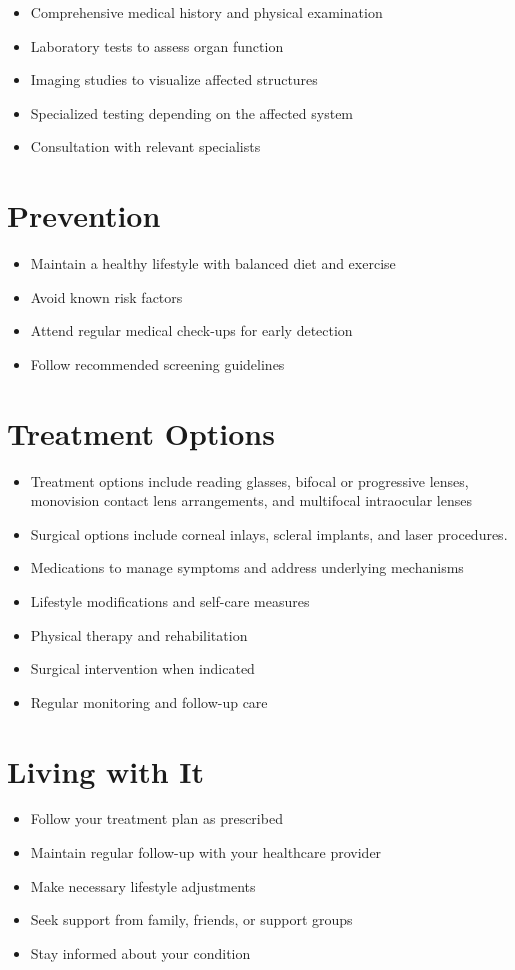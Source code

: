 \begin{itemize}[noitemsep]
  \item Comprehensive medical history and physical examination
  \item Laboratory tests to assess organ function
  \item Imaging studies to visualize affected structures
  \item Specialized testing depending on the affected system
  \item Consultation with relevant specialists
\end{itemize}
\section{Prevention}
\begin{itemize}[noitemsep]
  \item Maintain a healthy lifestyle with balanced diet and exercise
  \item Avoid known risk factors
  \item Attend regular medical check-ups for early detection
  \item Follow recommended screening guidelines
\end{itemize}
\section{Treatment Options}
\begin{itemize}[noitemsep]
  \item Treatment options include reading glasses, bifocal or progressive lenses, monovision contact lens arrangements, and multifocal intraocular lenses
  \item Surgical options include corneal inlays, scleral implants, and laser procedures.
  \item Medications to manage symptoms and address underlying mechanisms
  \item Lifestyle modifications and self-care measures
  \item Physical therapy and rehabilitation
  \item Surgical intervention when indicated
  \item Regular monitoring and follow-up care
\end{itemize}
\section{Living with It}
\begin{itemize}[noitemsep]
  \item Follow your treatment plan as prescribed
  \item Maintain regular follow-up with your healthcare provider
  \item Make necessary lifestyle adjustments
  \item Seek support from family, friends, or support groups
  \item Stay informed about your condition
\end{itemize}
